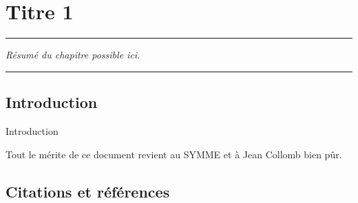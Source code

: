 
\lhead[\fancyplain{}{\leftmark}]%
{\fancyplain{}{}} %
\chead[\fancyplain{}{}]%
{\fancyplain{}{}}
\rhead[\fancyplain{}{}]%
{\fancyplain{}{\rightmark}}%
\lfoot[\fancyplain{}{}]%
{\fancyplain{}{}}
\cfoot[\fancyplain{}{\thepage}]%
{\fancyplain{}{\thepage}} %
\rfoot[\fancyplain{}{}]%
{\fancyplain{}{\scriptsize}}



\adjustmtc %

\chapter{Titre 1}
\label{ch:1}


\begin{center}
	\rule{0.7\linewidth}{.5pt}
	\begin{minipage}{0.7\linewidth}
		\smallskip
		
		\textit{Résumé du chapitre possible ici.
		}
		
	\end{minipage}
	\smallskip
	\rule{0.7\linewidth}{.5pt}
\end{center}

\minitoc
\newpage

\section{Introduction}
\label{Ch1:S:intro}

Introduction

Tout le mérite de ce document revient au SYMME et à Jean Collomb bien pûr.

\section{Citations et références}
\label{Ch1:S:citations et references}

